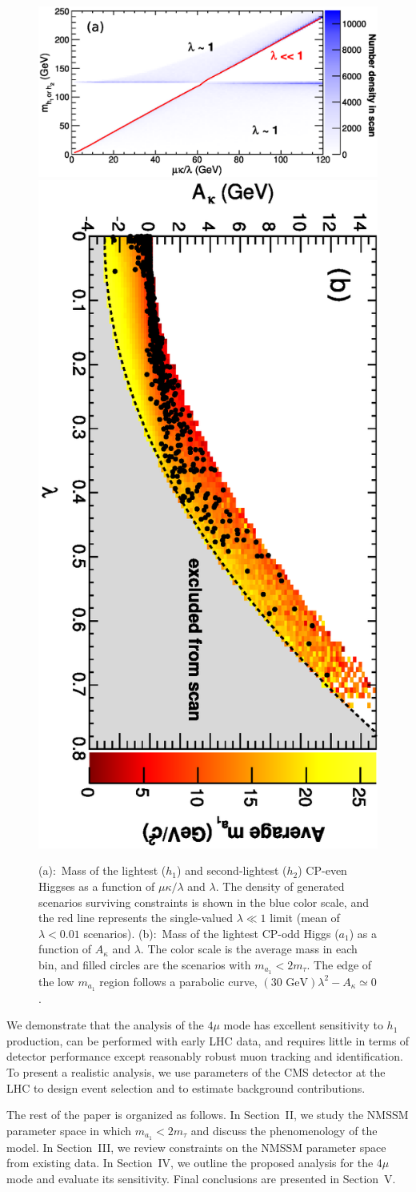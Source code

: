 \documentclass[aps,prl,twocolumn,nofootinbib,superscriptaddress]{revtex4}
\begin{document}
\begin{figure}[thbp]
\includegraphics[width=0.49\linewidth]{smass12_vs_mkovel}
\hfill
\includegraphics[height=0.48\linewidth,angle=90]{ma_vs_akappa_vs_lambda}

\caption{(a):~Mass of the lightest ($h_1$) and second-lightest ($h_2$)
  CP-even Higgses as a function of $\mu\kappa/\lambda$ and $\lambda$.
  The density of generated scenarios surviving constraints is shown in
  the blue color scale, and the red line represents the single-valued
  $\lambda \ll 1$ limit (mean of $\lambda < 0.01$ scenarios).
  (b):~Mass of the lightest CP-odd Higgs ($a_1$) as a function of
  $A_\kappa$ and $\lambda$.  The color scale is the average mass in
  each bin, and filled circles are the scenarios with $m_{a_1} <
  2m_\tau$. The edge of the low $m_{a_1}$ region follows a parabolic
  curve, $(\mbox{30~GeV})\lambda^2 - A_\kappa \simeq 0$.
 \label{fig:hmass_mukoverl}}
\end{figure}

We demonstrate that the analysis of the $4\mu$ mode has excellent
sensitivity to $h_1$ production, can be performed with early LHC data,
and requires little in terms of detector performance except reasonably
robust muon tracking and identification.  To present a realistic
analysis, we use parameters of the CMS detector at the LHC to design
event selection and to estimate background contributions.

The rest of the paper is organized as follows.  In Section~II, we
study the NMSSM parameter space in which $m_{a_1} < 2m_\tau$ and
discuss the phenomenology of the model. In Section~III, we review
constraints on the NMSSM parameter space from existing data.  In
Section~IV, we outline the proposed analysis for the 4$\mu$ mode and
evaluate its sensitivity.  Final conclusions are presented in
Section~V.
\end{document}
